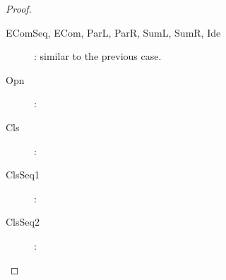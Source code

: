 \begin{proposition}
\begin{proof}
\begin{description}
      \item[EComSeq, ECom, ParL, ParR, SumL, SumR, Ide]: similar to the previous case.
      \item[Opn]:
      \item[Cls]:
      \item[ClsSeq1]:
      \item[ClsSeq2]:
    \end{description}
  \end{proof}
\end{proposition}



